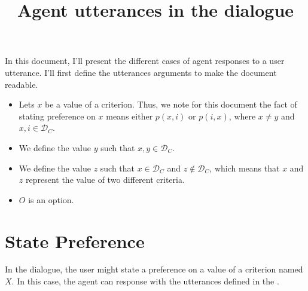 \documentclass{llncs}
\begin{document}
\title{Agent utterances in the dialogue}
\maketitle 

\par In this document, I'll present the different cases of agent responses to a user utterance. 
I'll first define the utterances arguments to make the document readable.
\begin{itemize}
\item Lets $x$ be a value of a criterion. Thus, we note for this document the fact of stating preference on $x$ means either $p(x,i)$ or $p(i,x)$, where $x \not=  y$  and $x, i \in \mathcal{D}_C$.
\item We define the value $y$ such that  $x, y \in \mathcal{D}_C$.
\item We define the value $z$ such that  $x\in \mathcal{D}_C$ and $z \notin \mathcal{D}_C$, which means that $x$ and $z$ represent the value of two different criteria.
\item $O$ is an option.
\end{itemize}

\section{State Preference}
In the dialogue, the user might state a preference on a value of a criterion named $X$. In this case, the agent can response with the utterances defined in the . 
\end{document}
